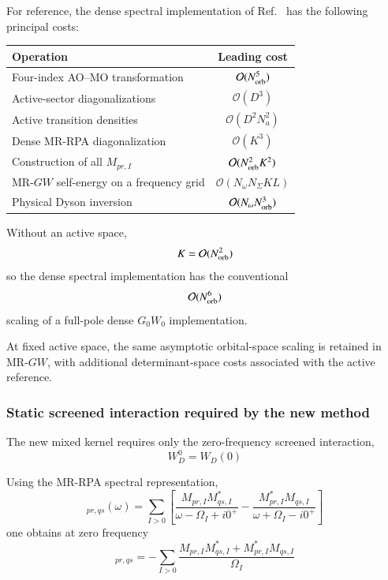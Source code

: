 \documentclass[aip,jcp,reprint,noshowkeys,superscriptaddress]{revtex4-1}
\begin{document}
For reference, the dense spectral implementation of
Ref.~\cite{WangFangLi2026} has the following principal costs:
\begin{center}
\begin{tabular}{l c}
\hline
Operation & Leading cost \\
\hline
Four-index AO--MO transformation
&
$\mathcal O(N_{\rm orb}^5)$
\\
Active-sector diagonalizations
&
$\mathcal O(D^3)$
\\
Active transition densities
&
$\mathcal O(D^2N_a^2)$
\\
Dense MR-RPA diagonalization
&
$\mathcal O(K^3)$
\\
Construction of all $M_{pr,I}$
&
$\mathcal O(N_{\rm orb}^2K^2)$
\\
MR-$GW$ self-energy on a frequency grid
&
$\mathcal O(N_\omega N_\Sigma K L)$
\\
Physical Dyson inversion
&
$\mathcal O(N_\omega N_{\rm orb}^3)$
\\
\hline
\end{tabular}
\end{center}

Without an active space,
\begin{equation}
  K
  =
  \mathcal O(N_{\rm orb}^2)
\end{equation}
so the dense spectral implementation has the conventional
\begin{equation}
  \mathcal O(N_{\rm orb}^6)
\end{equation}
scaling of a full-pole dense $G_0W_0$ implementation.

At fixed active space, the same asymptotic orbital-space scaling is
retained in MR-$GW$, with additional determinant-space costs associated
with the active reference.


\subsubsection{Static screened interaction required by the new method}

The new mixed kernel requires only the zero-frequency screened
interaction,
\begin{equation}
  W_D^0
  =
  W_D(0)
\end{equation}

Using the MR-RPA spectral representation,
\begin{equation}
  [w_D^c]_{pr,qs}(\omega)
  =
  \sum_{I>0}
  \left[
    \frac{
      M_{pr,I}M_{qs,I}^*
    }{
      \omega-\Omega_I+i0^+
    }
    -
    \frac{
      M_{pr,I}^*M_{qs,I}
    }{
      \omega+\Omega_I-i0^+
    }
  \right]
\end{equation}
one obtains at zero frequency
\begin{equation}
  [w_D^c(0)]_{pr,qs}
  =
  -
  \sum_{I>0}
  \frac{
    M_{pr,I}M_{qs,I}^*
    +
    M_{pr,I}^*M_{qs,I}
  }{
    \Omega_I
  }
  \label{eq:wc-zero}
\end{equation}
\end{document}
